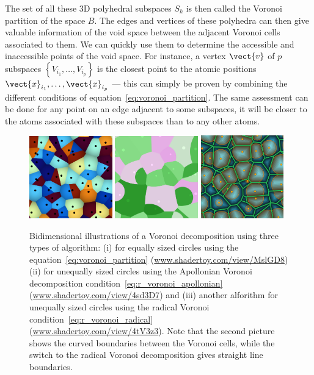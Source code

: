 \documentclass[main]{subfiles}
\begin{document}
The set of all these 3D polyhedral subspaces $S_{k}$ is then called the Voronoi partition of the space $B$. The edges and vertices of these polyhedra can then give valuable information of the void space between the adjacent Voronoi cells associated to them. We can quickly use them to determine the accessible and inaccessible points of the void space. For instance, a vertex $\vect{v}$ of $p$ subspaces $\left\{V_{i_1},\ldots,V_{i_p}\right\}$ is the closest point to the atomic positions $\vect{x}_{i_1},\ldots,\vect{x}_{i_p}$ --- this can simply be proven by combining the different conditions of equation~\ref{eq:voronoi_partition}. The same assessment can be done for any point on an edge adjacent to some subspaces, it will be closer to the atoms associated with these subspaces than to any other atoms. 


\begin{figure}[ht]
  \centering
  \includegraphics[width=0.32\textwidth]{figures/3-fastsim/voronoi.jpg}
  \includegraphics[width=0.32\textwidth]{figures/3-fastsim/voronoi_apollonian.jpg}
  \includegraphics[width=0.32\textwidth]{figures/3-fastsim/voronoi_radical.jpg}
  \caption{Bidimensional illustrations of a Voronoi decomposition using three types of algorithm: (i) for equally sized circles using the equation~\ref{eq:voronoi_partition} (\url{www.shadertoy.com/view/MslGD8}) (ii) for unequally sized circles using the Apollonian Voronoi decomposition condition~\ref{eq:r_voronoi_apollonian} (\url{www.shadertoy.com/view/4sd3D7}) and (iii) another alforithm for unequally sized circles using the radical Voronoi condition~\ref{eq:r_voronoi_radical} (\url{www.shadertoy.com/view/4tV3z3}). Note that the second picture shows the curved boundaries between the Voronoi cells, while the switch to the radical Voronoi decomposition gives straight line boundaries.}\label{fgr:voronoi_illustration}
\end{figure}
\end{document}
